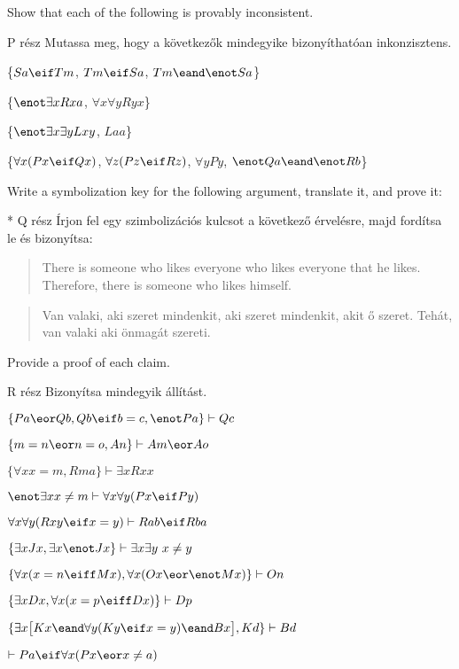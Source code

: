 \problempart
Show that each of the following is provably inconsistent.

P rész Mutassa meg, hogy a következők mindegyike bizonyíthatóan inkonzisztens.

\begin{earg}
\item \{$Sa\eif Tm$, $Tm \eif Sa$, $Tm \eand \enot Sa$\}
\item \{$\enot\exists x Rxa$, $\forall x \forall y Ryx$\}
\item \{$\enot\exists x \exists y Lxy$, $Laa$\}
\item \{$\forall x(Px \eif Qx)$, $\forall z(Pz \eif Rz)$, $\forall y Py$, $\enot Qa \eand \enot Rb$\}
\end{earg}



\solutions
\problempart
\label{pr.likes}
Write a symbolization key for the following argument, translate it, and prove it:

* Q rész Írjon fel egy szimbolizációs kulcsot a következő érvelésre, majd fordítsa le és bizonyítsa:

\begin{quote}
There is someone who likes everyone who likes everyone that he likes. Therefore, there is someone who likes himself.
\end{quote}

\begin{quote}
Van valaki, aki szeret mindenkit, aki szeret mindenkit, akit ő szeret. Tehát, van valaki aki önmagát szereti.
\end{quote}




\problempart
\label{pr.identity}
Provide a proof of each claim.

R rész Bizonyítsa mindegyik állítást.

\begin{earg}
\item $\{Pa \eor Qb, Qb \eif b=c, \enot Pa\}\vdash Qc$
\item $\{m=n \eor n=o, An\}\vdash Am \eor Ao$
\item $\{\forall x x=m, Rma\}\vdash \exists x Rxx$
\item $\enot \exists x x \neq m \vdash \forall x\forall y (Px \eif Py)$
\item $\forall x\forall y(Rxy \eif x=y)\vdash Rab \eif Rba$
\item $\{\exists x Jx, \exists x \enot Jx\}\vdash \exists x \exists y\ x\neq y$
\item $\{\forall x(x=n \eiff Mx), \forall x(Ox \eor \enot Mx)\}\vdash On$
\item $\{\exists x Dx, \forall x(x=p \eiff Dx)\}\vdash Dp$
\item $\{\exists x\bigl[Kx \eand \forall y(Ky \eif x=y) \eand Bx\bigr], Kd\}\vdash Bd$
\item $\vdash Pa \eif \forall x(Px \eor x \neq a)$
\end{earg}



